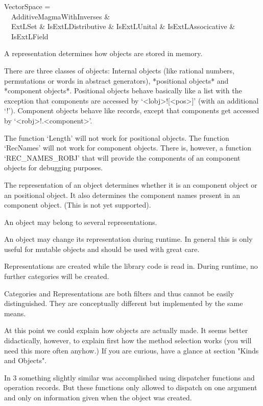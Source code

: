 VectorSpace = \\
\ \ AdditiveMagmaWithInverses \& \\
\ \ ExtLSet \& IsExtLDistributive \& IsExtLUnital \& IsExtLAssocicative \& \\
\ \ IsExtLField



A representation determines how objects are stored in memory.

There are three classes of objects: Internal objects (like rational numbers,
permutations or words in abstract generators), *positional objects* and
*component objects*. Positional objects behave basically like a list with
the exception that components are accessed by `<lobj>\/![<pos>]'
(with an additional `!'). Component objects behave
like records, except that components get accessed by `<robj>\/!.<component>'.

\danger
The function `Length' will not work for positional objects. The function
`RecNames' will not work for component objects. There is, however, a
function `REC_NAMES_ROBJ' that will provide the components of an component
objects for debugging purposes.

The representation of an object determines whether it is an component
object or an positional object. It also determines the component names
present in an component object.
(This is not yet supported).

An object may belong to several representations.

\danger
An object may change its representation during runtime. In general this is
only useful for mutable objects and should be used with great care.

\danger
Representations are created while the library code is read in. During runtime,
no further categories will be created.


\danger
Categories and Representations are both filters and thus cannot be easily
distinguished. They are conceptually different but implemented by the same
means.

At this point we could explain how objects are actually made. It seems
better didactically, however, to explain first how the method selection
works (you will need this more often anyhow.) If you are curious, have a
glance at section "Kinds and Objects".


\danger
In {\GAP} 3 something slightly similar was accomplished using dispatcher
functions and operation records. But these functions only allowed to
dispatch on one argument and only on information given when the object was
created.

